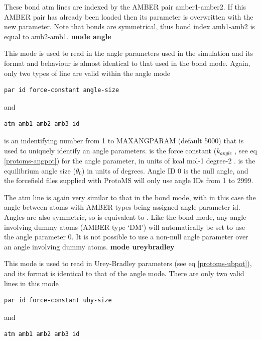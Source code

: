\documentclass[letterpaper,10pt,english]{manual}
\begin{document}
These bond atm lines are indexed by the AMBER pair amber1-amber2. If this AMBER pair has already been loaded then its parameter is overwritten with the new parameter. Note that bonds are symmetrical, thus bond index amb1-amb2 is equal to amb2-amb1.
\textbf{mode angle}

This mode is used to read in the angle parameters used in the simulation and its format and behaviour is almost identical to that used in the bond mode. Again, only two types of line are valid within the angle mode

\begin{Verbatim}[commandchars=@\[\]]
par id force-constant angle-size
\end{Verbatim}

and

\begin{Verbatim}[commandchars=@\[\]]
atm amb1 amb2 amb3 id
\end{Verbatim}

 is an indentifying number from 1 to MAXANGPARAM (default 5000) that is used to uniquely identify an angle parameters.  is the force constant ($k_{angle}$ , see eq \eqref{protoms-angpot}) for the angle parameter, in units of kcal mol-1 degree-2 .  is the equilibrium angle size ($\theta_0$) in units of degrees. Angle ID 0 is the null angle, and the forcefield files supplied with ProtoMS will only use angle IDs from 1 to 2999.

The atm line is again very similar to that in the bond mode, with in this case the angle between atoms with AMBER types  being assigned angle parameter id. Angles are also symmetric, so  is equivalent to . Like the bond mode, any angle involving dummy atoms (AMBER type ‘DM’) will automatically be set to use the angle parameter 0. It is not possible to use a non-null angle parameter over an angle involving dummy atoms.
\textbf{mode ureybradley}

This mode is used to read in Urey-Bradley parameters (see eq \eqref{protoms-ubpot}), and its format is identical to that of the angle mode. There are only two valid lines in this mode

\begin{Verbatim}[commandchars=@\[\]]
par id force-constant uby-size
\end{Verbatim}

and

\begin{Verbatim}[commandchars=@\[\]]
atm amb1 amb2 amb3 id
\end{Verbatim}
\end{document}

